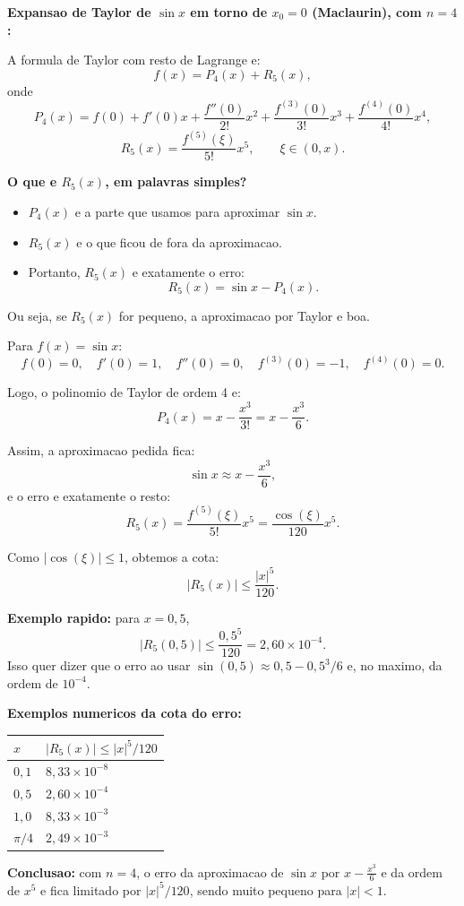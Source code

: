 \textbf{Expansao de Taylor de $\sin x$ em torno de $x_0=0$ (Maclaurin), com $n=4$:}

A formula de Taylor com resto de Lagrange e:
\[
f(x)=P_4(x)+R_5(x),
\]
onde
\[
P_4(x)=f(0)+f'(0)x+\frac{f''(0)}{2!}x^2+\frac{f^{(3)}(0)}{3!}x^3+\frac{f^{(4)}(0)}{4!}x^4,
\]
\[
R_5(x)=\frac{f^{(5)}(\xi)}{5!}x^5,\qquad \xi\in(0,x).
\]

\textbf{O que e $R_5(x)$, em palavras simples?}

\begin{itemize}
\item $P_4(x)$ e a parte que usamos para aproximar $\sin x$.
\item $R_5(x)$ e o que ficou de fora da aproximacao.
\item Portanto, $R_5(x)$ e exatamente o erro:
\[
R_5(x)=\sin x-P_4(x).
\]
\end{itemize}

Ou seja, se $R_5(x)$ for pequeno, a aproximacao por Taylor e boa.

Para $f(x)=\sin x$:
\[
f(0)=0,\quad f'(0)=1,\quad f''(0)=0,\quad f^{(3)}(0)=-1,\quad f^{(4)}(0)=0.
\]

Logo, o polinomio de Taylor de ordem 4 e:
\[
P_4(x)=x-\frac{x^3}{3!}=x-\frac{x^3}{6}.
\]

Assim, a aproximacao pedida fica:
\[
\sin x\approx x-\frac{x^3}{6},
\]
e o erro e exatamente o resto:
\[
R_5(x)=\frac{f^{(5)}(\xi)}{5!}x^5=\frac{\cos(\xi)}{120}x^5.
\]

Como $|\cos(\xi)|\le 1$, obtemos a cota:
\[
|R_5(x)|\le \frac{|x|^5}{120}.
\]

\textbf{Exemplo rapido:} para $x=0{,}5$,
\[
|R_5(0{,}5)|\le \frac{0{,}5^5}{120}=2{,}60\times10^{-4}.
\]
Isso quer dizer que o erro ao usar $\sin(0{,}5)\approx 0{,}5-0{,}5^3/6$ e, no maximo, da ordem de $10^{-4}$.

\textbf{Exemplos numericos da cota do erro:}
\begin{center}
\begin{tabular}{ll}
\hline
$x$ & $|R_5(x)|\le |x|^5/120$ \\
\hline
$0{,}1$ & $8{,}33\times 10^{-8}$ \\
$0{,}5$ & $2{,}60\times 10^{-4}$ \\
$1{,}0$ & $8{,}33\times 10^{-3}$ \\
$\pi/4$ & $2{,}49\times 10^{-3}$ \\
\hline
\end{tabular}
\end{center}

\textbf{Conclusao:} com $n=4$, o erro da aproximacao de $\sin x$ por $x-\frac{x^3}{6}$ e da ordem de $x^5$ e fica limitado por $|x|^5/120$, sendo muito pequeno para $|x|<1$.